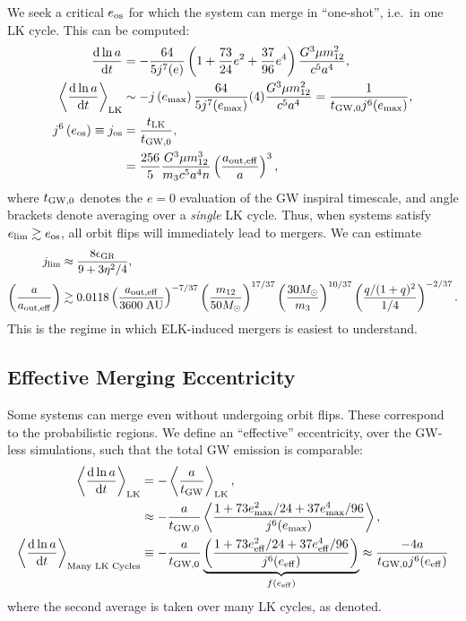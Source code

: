 \documentclass[11pt,
        usenames, %
        dvipsnames %
    ]{article}
\newcommand*{\rd}[2]{\frac{\mathrm{d}#1}{\mathrm{d}#2}}
\newcommand*{\ev}[1]{\left\langle#1\right\rangle}
\newcommand*{\p}[1]{\left(#1\right)}
\begin{document}
We seek a critical $e_{\rm os}$ for which the system can merge in ``one-shot'',
i.e.\ in one LK cycle. This can be computed:
\begin{align}
    \rd{\ln a}{t} &= -\frac{64}{5j^7(e)}\p{1 + \frac{73}{24}e^2 +
        \frac{37}{96}e^4}\frac{G^3 \mu m_{12}^2}{c^5a^4},\\
    \ev{\rd{\ln a}{t}}_{\rm LK} &\sim -j\p{e_{\max}}\frac{64}{5j^7(e_{\max})}
            (4) \frac{G^3\mu m_{12}^2}{c^5a^4}
            = \frac{1}{t_{\rm GW, 0}j^6(e_{\max})},\\
    j^6\p{e_{\rm os}} \equiv j_{\rm os}
        &= \frac{ t_{\rm LK}}{t_{\rm GW, 0}},\\
        &= \frac{256}{5}\frac{G^3 \mu m_{12}^3}{m_3c^5a^4n}
            \p{\frac{a_{\rm out, eff}}{a}}^3,
\end{align}
where $t_{\rm GW, 0}$ denotes the $e = 0$ evaluation of the GW inspiral
timescale, and angle brackets denote averaging over a \emph{single} LK cycle.
Thus, when systems satisfy $e_{\lim} \gtrsim e_{\rm os}$, all orbit flips will
immediately lead to mergers. We can estimate
\begin{align}
    j_{\lim} &\approx \frac{8\epsilon_{\rm GR}}{9 + 3\eta^2/4},\\
    \p{\frac{a}{a_{\rm out, eff}}} &\gtrsim
        0.0118
        \p{\frac{a_{\rm out, eff}}{3600\;\mathrm{AU}}}^{-7/37}
        \p{\frac{m_{12}}{50M_{\odot}}}^{17/37}
        \p{\frac{30M_{\odot}}{m_3}}^{10/37}
        \p{\frac{q / (1 + q)^2}{1/4}}^{-2/37}.
\end{align}
This is the regime in which ELK-induced mergers is easiest to
understand.

\subsection{Effective Merging Eccentricity}

Some systems can merge even without undergoing orbit flips. These correspond to
the probabilistic regions. We define an ``effective'' eccentricity, over the
GW-less simulations, such that the total GW emission is comparable:
\begin{align}
    \ev{\rd{\ln a}{t}}_{\rm LK} &= -\ev{\frac{a}{t_{\rm GW}}}_{\rm LK},\\
        &\approx -\frac{a}{t_{\rm GW, 0}}
            \ev{\frac{1 + 73e_{\max}^2/24 + 37e_{\max}^4/96}
                {j^6(e_{\max})}},\\
    \ev{\rd{\ln a}{t}}_{\text{Many LK Cycles}} &\equiv -\frac{a}{t_{\rm GW,0}}
            \underbrace{\p{\frac{1 + 73e_{\rm eff}^2/24 + 37e_{\rm
            eff}^4/96}{j^6(e_{\rm eff})}}}_{f\p{e_{\rm eff}}}
            \approx \frac{-4a}{t_{\rm GW, 0}j^6(e_{\rm eff})}\label{eq:e_eff}
\end{align}
where the second average is taken over many LK cycles, as denoted.
\end{document}
